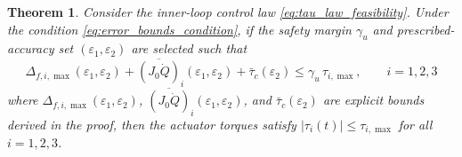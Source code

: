 \documentclass[journal]{new-aiaa}
\newtheorem{theorem}{Theorem}
\begin{document}
\begin{theorem}
\label{thm:feasibility_axis_compact2}
Consider the inner-loop control law \eqref{eq:tau_law_feasibility}. Under the condition \eqref{eq:error_bounds_condition}, 
if the safety margin $\gamma_u$ and prescribed-accuracy set $(\varepsilon_1,\varepsilon_2)$ are selected such that
\begin{equation}
\Delta_{f,i,\max}(\varepsilon_1,\varepsilon_2)
+\overline{(J_0 \dot Q)}_i(\varepsilon_1,\varepsilon_2)
+\bar\tau_c(\varepsilon_2)
\le \gamma_u\,\tau_{i,\max},\qquad i=1,2,3
\label{eq:thm4_axis_condition_compact2}
\end{equation}
where $\Delta_{f,i,\max}(\varepsilon_1,\varepsilon_2)$,
$\overline{(J_0 \dot Q)}_i(\varepsilon_1,\varepsilon_2)$, and $\bar\tau_c(\varepsilon_2)$
are explicit bounds derived in the proof,
then the actuator torques satisfy $|\tau_i(t)|\le \tau_{i,\max}$ for all $i=1,2,3$.
\end{theorem}
\end{document}
